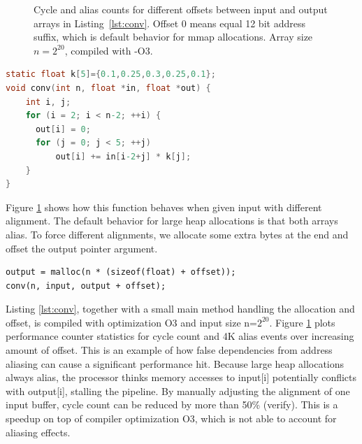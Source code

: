 \documentclass[a4paper,10pt,twocolumn,twoside]{article}
\begin{document}
\begin{figure}[t]
  \caption{Cycle and alias counts for different offsets between input and output arrays in Listing~\ref{lst:conv}. Offset 0 means equal 12 bit address suffix, which is default behavior for mmap allocations. Array size $n=2^{20}$, compiled with -O3. }
  \label{fig:heapalias}
\end{figure}

\begin{lstlisting}[float=h, language=C, caption={Naive implementation of convolution. Highly sensitive to aliasing between input and output arrays.}, label={lst:conv}, frame=lines]
static float k[5]={0.1,0.25,0.3,0.25,0.1};
void conv(int n, float *in, float *out) {
    int i, j;
    for (i = 2; i < n-2; ++i) {
      out[i] = 0;
      for (j = 0; j < 5; ++j)
          out[i] += in[i-2+j] * k[j];
    }
}
\end{lstlisting}

Figure \ref{fig:heapalias} shows how this function behaves when given input with different alignment.
The default behavior for large heap allocations is that both arrays alias.
To force different alignments, we allocate some extra bytes at the end and offset the output pointer argument.

\begin{lstlisting}
output = malloc(n * (sizeof(float) + offset));
conv(n, input, output + offset);
\end{lstlisting}

Listing \ref{lst:conv}, together with a small main method handling the allocation and offset, is compiled with optimization O3 and input size n=$2^{20}$.
Figure \ref{fig:heapalias} plots performance counter statistics for cycle count and 4K alias events over increasing amount of offset.
This is an example of how false dependencies from address aliasing can cause a significant performance hit.
Because large heap allocations always alias, the processor thinks memory accesses to input[i] potentially conflicts with output[i], stalling the pipeline.
By manually adjusting the alignment of one input buffer, cycle count can be reduced by more than 50\% (verify).
This is a speedup on top of compiler optimization O3, which is not able to account for aliasing effects.
\end{document}
